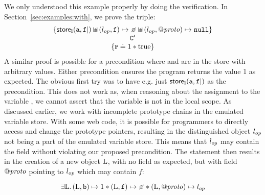 \documentclass{article}
\begin{document}
We only understood this example properly by doing the verification.  In Section~\ref{sec:examples:with}, we prove the triple:
\[\begin{array}{c}
        \{ \store_{\ls}(\js{a},\js{f}|) \sepish(\lop,\js{f})\pointsto\none\sepish(\lop,\protop)\pointsto\nil\}\\
        \js{C}'\\
        \{\rv\doteq 1 \sep \true\}
\end{array}\]
A similar proof is possible for a precondition where  and
 are in the store with  arbitrary values. Either
precondition ensures the program returns the value 1 as expected. The
obvious first try was to have e.g. just $\mathsf{store}_{\textbf{l}}(\mbox{\texttt{{\upshape a}}},\mbox{\texttt{{\upshape f}}}|)$ as
the precondition. This does not work as, when reasoning about the
assignment to the variable , we cannot assert that the variable
 is not in the local scope. As discussed
earlier, 
we work with incomplete prototype
chains in the emulated variable store.  With some web code, it is
possible for programmers to directly access and change the prototype pointers, resulting in
the distinguished object $l_{op}$
not being a part of the emulated variable store. This means that  $l_{op}$ may contain the field  without violating our
proposed precondition. The statement  then results in
the creation of a new object ${\mathrm{L}}$, with no field  as
expected, but with field $\mathit{@proto}$ pointing to $l_{op}$ which may contain $f$:

\[\exists\V{L}\st (\V{L},\js{b})\pointsto 1 \sep (\V{L},\js{f})\pointsto\none \sep (\V{L},\protop)\pointsto \lop\]
\end{document}
